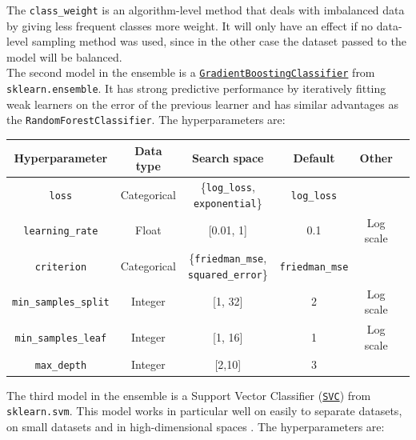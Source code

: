 \documentclass[11pt]{article}
\begin{document}
The \texttt{class\_weight} is an algorithm-level method that deals with imbalanced data by giving less frequent classes more weight. It will only have an effect if no data-level sampling method was used, since in the other case the dataset passed to the model will be balanced. \\

The second model in the ensemble is a \href{https://scikit-learn.org/stable/modules/generated/sklearn.ensemble.GradientBoostingClassifier.html}{\texttt{GradientBoostingClassifier}} from \texttt{sklearn.ensemble}. It has strong predictive performance by iteratively fitting weak learners on the error of the previous learner and has similar advantages as the \texttt{RandomForestClassifier}. The hyperparameters are:

\begin{table}[H]
\centering
\begin{tabular}{ | c | c | c | c | c | c | }
 \hline
  Hyperparameter & Data type & Search space & Default & Other \\
 \hline
 \texttt{loss} & Categorical & \{\texttt{log\_loss}, \texttt{exponential}\} & \texttt{log\_loss} &  \\ 
 \texttt{learning\_rate} & Float & [0.01, 1] & 0.1 & Log scale  \\ 
 \texttt{criterion} & Categorical & \{\texttt{friedman\_mse}, \texttt{squared\_error}\} & \texttt{friedman\_mse} &   \\ 
 \texttt{min\_samples\_split} & Integer & [1, 32] & 2 & Log scale \\ 
 \texttt{min\_samples\_leaf} & Integer & [1, 16] & 1 & Log scale  \\
 \texttt{max\_depth}  & Integer & [2,10] & 3 &  \\ 
 \hline
\end{tabular}
\end{table}

\newpage
The third model in the ensemble is a Support Vector Classifier (\href{https://scikit-learn.org/stable/modules/generated/sklearn.svm.SVC.html#sklearn.svm.SVC}{\texttt{SVC}}) from \texttt{sklearn.svm}. This model works in particular well on easily to separate datasets, on small datasets and in high-dimensional spaces \citep{GfG}. The hyperparameters are:
\end{document}
